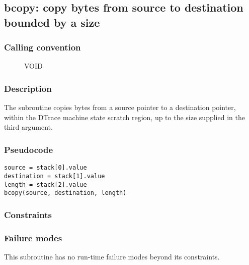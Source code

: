 \clearpage
{}
{}
\label{subr:bcopy}
\subsection*{bcopy: copy bytes from source to destination bounded by a
size}

\subsubsection*{Calling convention}

\begin{description}
\item[] VOID
\end{description}

\subsubsection*{Description}

The  subroutine copies bytes from a source pointer
to a destination pointer, within the DTrace machine state scratch
region, up to the size supplied in the third argument.
\subsubsection*{Pseudocode}

\begin{verbatim}
source = stack[0].value
destination = stack[1].value
length = stack[2].value
bcopy(source, destination, length)
\end{verbatim}

\subsubsection*{Constraints}

\subsubsection*{Failure modes}

This subroutine has no run-time failure modes beyond its constraints.
